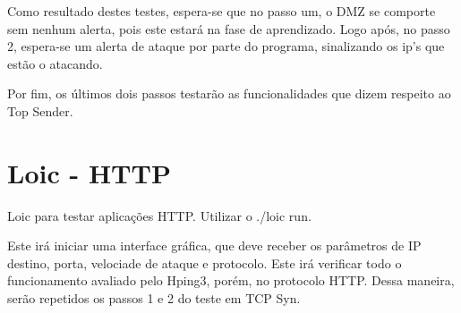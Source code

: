 Como resultado destes testes, espera-se que no passo um, o DMZ se comporte sem
nenhum alerta, pois este estará na fase de aprendizado. Logo após, no passo 2,
espera-se um alerta de ataque por parte do programa, sinalizando os ip's que estão
o atacando.

Por fim, os últimos dois passos testarão as funcionalidades que dizem respeito
ao Top Sender.

\section{Loic - HTTP}
\label{sec:Loic - HTTP}
Loic para testar aplicações HTTP. Utilizar o ./loic run.

Este irá iniciar uma interface gráfica, que deve receber os parâmetros de IP
destino, porta, velociade de ataque e protocolo. Este irá verificar todo o
funcionamento avaliado pelo Hping3, porém, no protocolo HTTP. Dessa maneira,
serão repetidos os passos 1 e 2 do teste em TCP Syn.
